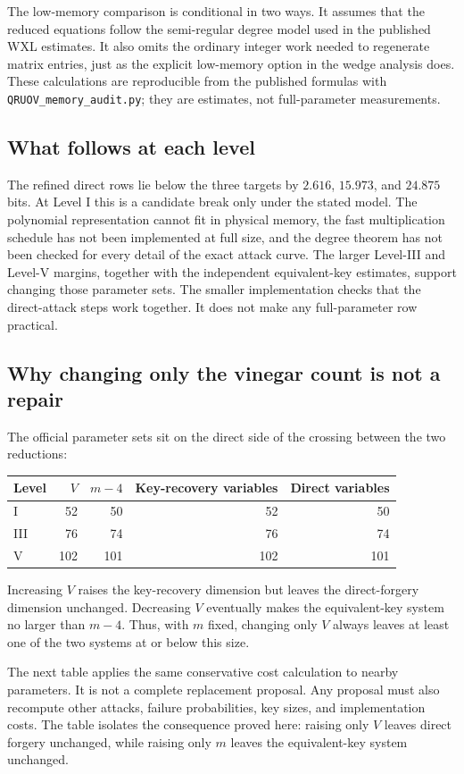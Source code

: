 \documentclass[11pt,a4paper]{article}
\theoremstyle{definition}
\theoremstyle{remark}
\begin{document}
The low-memory comparison is conditional in two ways.  It assumes that the
reduced equations follow the semi-regular degree model used in the published
WXL estimates.  It also omits the ordinary integer work needed to regenerate
matrix entries, just as the explicit low-memory option in the wedge analysis
does.  These calculations are reproducible from the published formulas with
\texttt{QRUOV\_memory\_audit.py}; they are estimates, not full-parameter
measurements.

\subsection{What follows at each level}
The refined direct rows lie below the three targets by $2.616$, $15.973$, and
$24.875$ bits.  At Level I this is a candidate break only under the stated
model.  The polynomial representation cannot fit in physical memory, the fast
multiplication schedule has not been implemented at full size, and the degree
theorem has not been checked for every detail of the exact attack curve.  The
larger Level-III and Level-V margins, together with the independent
equivalent-key estimates, support changing those parameter sets.  The smaller
implementation checks that the direct-attack steps work together.  It does not
make any full-parameter row practical.

\subsection{Why changing only the vinegar count is not a repair}
The official parameter sets sit on the direct side of the crossing between the
two reductions:
\begin{center}
\begin{tabular}{@{}lrrrr@{}}
\toprule
Level & $V$ & $m-4$ & Key-recovery variables & Direct variables\\
\midrule
I&52&50&52&50\\
III&76&74&76&74\\
V&102&101&102&101\\
\bottomrule
\end{tabular}
\end{center}
Increasing $V$ raises the key-recovery dimension but leaves the direct-forgery
dimension unchanged.  Decreasing $V$ eventually makes the
equivalent-key system no larger than $m-4$.  Thus, with $m$ fixed, changing
only $V$ always leaves at least one of the two systems at or below this size.

The next table applies the same conservative cost calculation to nearby
parameters.  It is not a complete replacement proposal.  Any proposal must
also recompute other attacks, failure probabilities, key sizes, and
implementation costs.  The table isolates the consequence proved here:
raising only $V$ leaves direct forgery unchanged, while raising only $m$
leaves the equivalent-key system unchanged.
\end{document}
